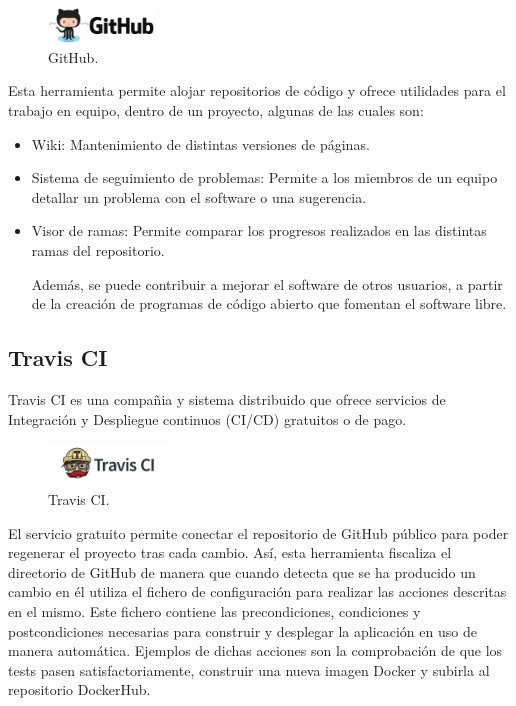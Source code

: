 \begin{figure}[H]
\centering
\includegraphics[width=0.25\textwidth]{images/figures/github.png}
\caption{GitHub.\label{fig:figure_placement_example}}
\end{figure}

Esta herramienta permite alojar repositorios de código y ofrece utilidades para el trabajo en equipo, dentro de un proyecto, algunas de las cuales son:
\begin{itemize}
\item Wiki: Mantenimiento de distintas versiones de páginas.
\item Sistema de seguimiento de problemas: Permite a los miembros de un equipo detallar un problema con el software o una sugerencia.
\item Visor de ramas: Permite comparar los progresos realizados en las distintas ramas del repositorio.

Además, se puede contribuir a mejorar el software de otros usuarios, a partir de la creación de programas de código abierto que fomentan el software libre.

\end{itemize}

\subsection{Travis CI}

Travis CI es una compañia y sistema distribuido que ofrece servicios de Integración y Despliegue continuos (CI/CD) gratuitos o de pago.

\begin{figure}[H]
\centering
\includegraphics[width=0.3\textwidth]{images/figures/travisci.jpg}
\caption{Travis CI.\label{fig:figure_placement_example}}
\end{figure}

El servicio gratuito permite conectar el repositorio de GitHub público para poder regenerar el proyecto tras cada cambio. Así, esta herramienta fiscaliza el directorio de GitHub de manera que cuando detecta que se ha producido un cambio en él utiliza el fichero de configuración  para realizar las acciones descritas en el mismo. Este fichero contiene las precondiciones, condiciones y postcondiciones necesarias para construir y desplegar la aplicación en uso de manera automática. Ejemplos de dichas acciones son la comprobación de que los tests pasen satisfactoriamente, construir una nueva imagen Docker y subirla al repositorio DockerHub.

